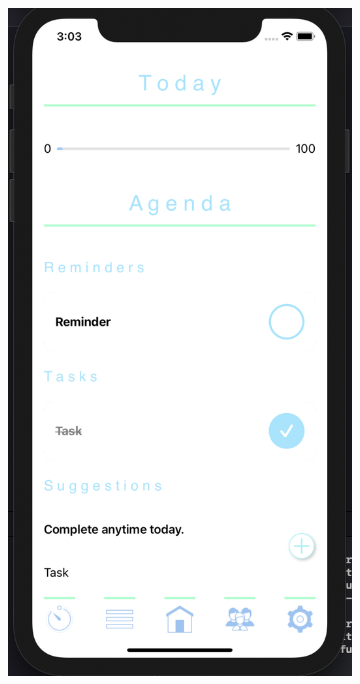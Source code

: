 \begin{figure}[H]
\begin{subfigure}[b]{0.3\textwidth}
        \label{fig:agenda_today_app}
    \end{subfigure}
    \hfill
    \begin{subfigure}[b]{0.3\textwidth}
        \centering
        \includegraphics[width=\textwidth]{./graphics/Implementation/Dashboard/agenda today completed task.png}

\end{subfigure}
\end{figure}
